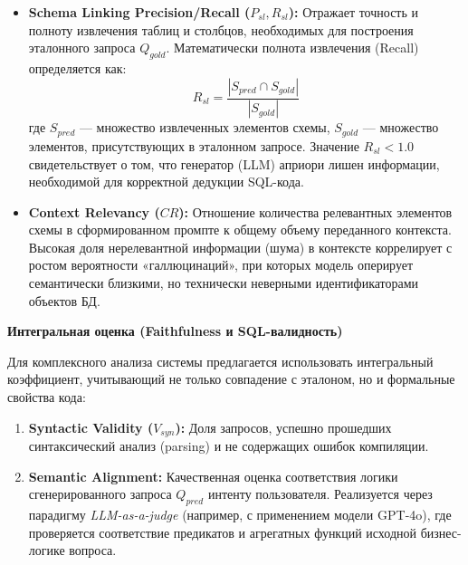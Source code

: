 \begin{itemize}
    \item \textbf{Schema Linking Precision/Recall ($P_{sl}, R_{sl}$):} Отражает точность и полноту извлечения таблиц и столбцов, необходимых для построения эталонного запроса $Q_{gold}$. Математически полнота извлечения (Recall) определяется как:
    $$R_{sl} = \frac{|S_{pred} \cap S_{gold}|}{|S_{gold}|}$$
    где $S_{pred}$ — множество извлеченных элементов схемы, $S_{gold}$ — множество элементов, присутствующих в эталонном запросе. Значение $R_{sl} < 1.0$ свидетельствует о том, что генератор (LLM) априори лишен информации, необходимой для корректной дедукции SQL-кода.

    \item \textbf{Context Relevancy ($CR$):} Отношение количества релевантных элементов схемы в сформированном промпте к общему объему переданного контекста. Высокая доля нерелевантной информации (шума) в контексте коррелирует с ростом вероятности «галлюцинаций», при которых модель оперирует семантически близкими, но технически неверными идентификаторами объектов БД.
\end{itemize}

\textbf{Интегральная оценка (Faithfulness и SQL-валидность)}

Для комплексного анализа системы предлагается использовать интегральный коэффициент, учитывающий не только совпадение с эталоном, но и формальные свойства кода:

\begin{enumerate}
    \item \textbf{Syntactic Validity ($V_{syn}$):} Доля запросов, успешно прошедших синтаксический анализ (parsing) и не содержащих ошибок компиляции.
    \item \textbf{Semantic Alignment:} Качественная оценка соответствия логики сгенерированного запроса $Q_{pred}$ интенту пользователя. Реализуется через парадигму \textit{LLM-as-a-judge} (например, с применением модели GPT-4o), где проверяется соответствие предикатов и агрегатных функций исходной бизнес-логике вопроса.
\end{enumerate}

